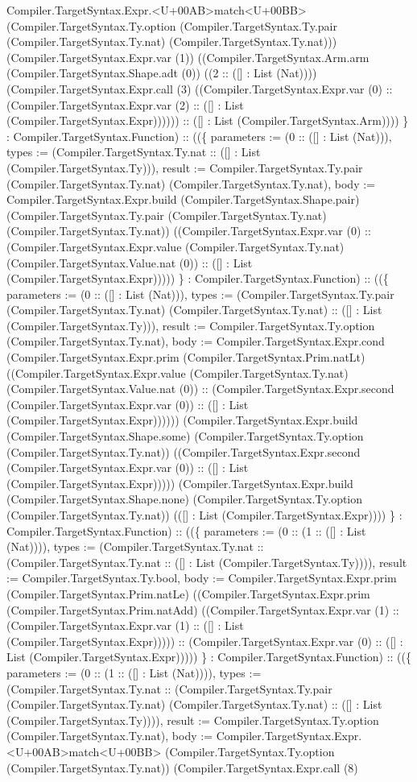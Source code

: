\documentclass[11pt]{article}
\begin{document}
Compiler.TargetSyntax.Expr.<U+00AB>match<U+00BB> (Compiler.TargetSyntax.Ty.option (Compiler.TargetSyntax.Ty.pair (Compiler.TargetSyntax.Ty.nat) (Compiler.TargetSyntax.Ty.nat))) (Compiler.TargetSyntax.Expr.var (1)) ((Compiler.TargetSyntax.Arm.arm (Compiler.TargetSyntax.Shape.adt (0)) ((2 :: ([] : List (Nat)))) (Compiler.TargetSyntax.Expr.call (3) ((Compiler.TargetSyntax.Expr.var (0) :: (Compiler.TargetSyntax.Expr.var (2) :: ([] : List (Compiler.TargetSyntax.Expr)))))) :: ([] : List (Compiler.TargetSyntax.Arm)))) \} : Compiler.TargetSyntax.Function) :: ((\{ parameters := (0 :: ([] : List (Nat))), types := (Compiler.TargetSyntax.Ty.nat :: ([] : List (Compiler.TargetSyntax.Ty))), result := Compiler.TargetSyntax.Ty.pair (Compiler.TargetSyntax.Ty.nat) (Compiler.TargetSyntax.Ty.nat), body := Compiler.TargetSyntax.Expr.build (Compiler.TargetSyntax.Shape.pair) (Compiler.TargetSyntax.Ty.pair (Compiler.TargetSyntax.Ty.nat) (Compiler.TargetSyntax.Ty.nat)) ((Compiler.TargetSyntax.Expr.var (0) :: (Compiler.TargetSyntax.Expr.value (Compiler.TargetSyntax.Ty.nat) (Compiler.TargetSyntax.Value.nat (0)) :: ([] : List (Compiler.TargetSyntax.Expr))))) \} : Compiler.TargetSyntax.Function) :: ((\{ parameters := (0 :: ([] : List (Nat))), types := (Compiler.TargetSyntax.Ty.pair (Compiler.TargetSyntax.Ty.nat) (Compiler.TargetSyntax.Ty.nat) :: ([] : List (Compiler.TargetSyntax.Ty))), result := Compiler.TargetSyntax.Ty.option (Compiler.TargetSyntax.Ty.nat), body := Compiler.TargetSyntax.Expr.cond (Compiler.TargetSyntax.Expr.prim (Compiler.TargetSyntax.Prim.natLt) ((Compiler.TargetSyntax.Expr.value (Compiler.TargetSyntax.Ty.nat) (Compiler.TargetSyntax.Value.nat (0)) :: (Compiler.TargetSyntax.Expr.second (Compiler.TargetSyntax.Expr.var (0)) :: ([] : List (Compiler.TargetSyntax.Expr)))))) (Compiler.TargetSyntax.Expr.build (Compiler.TargetSyntax.Shape.some) (Compiler.TargetSyntax.Ty.option (Compiler.TargetSyntax.Ty.nat)) ((Compiler.TargetSyntax.Expr.second (Compiler.TargetSyntax.Expr.var (0)) :: ([] : List (Compiler.TargetSyntax.Expr))))) (Compiler.TargetSyntax.Expr.build (Compiler.TargetSyntax.Shape.none) (Compiler.TargetSyntax.Ty.option (Compiler.TargetSyntax.Ty.nat)) (([] : List (Compiler.TargetSyntax.Expr)))) \} : Compiler.TargetSyntax.Function) :: ((\{ parameters := (0 :: (1 :: ([] : List (Nat)))), types := (Compiler.TargetSyntax.Ty.nat :: (Compiler.TargetSyntax.Ty.nat :: ([] : List (Compiler.TargetSyntax.Ty)))), result := Compiler.TargetSyntax.Ty.bool, body := Compiler.TargetSyntax.Expr.prim (Compiler.TargetSyntax.Prim.natLe) ((Compiler.TargetSyntax.Expr.prim (Compiler.TargetSyntax.Prim.natAdd) ((Compiler.TargetSyntax.Expr.var (1) :: (Compiler.TargetSyntax.Expr.var (1) :: ([] : List (Compiler.TargetSyntax.Expr))))) :: (Compiler.TargetSyntax.Expr.var (0) :: ([] : List (Compiler.TargetSyntax.Expr))))) \} : Compiler.TargetSyntax.Function) :: ((\{ parameters := (0 :: (1 :: ([] : List (Nat)))), types := (Compiler.TargetSyntax.Ty.nat :: (Compiler.TargetSyntax.Ty.pair (Compiler.TargetSyntax.Ty.nat) (Compiler.TargetSyntax.Ty.nat) :: ([] : List (Compiler.TargetSyntax.Ty)))), result := Compiler.TargetSyntax.Ty.option (Compiler.TargetSyntax.Ty.nat), body := Compiler.TargetSyntax.Expr.<U+00AB>match<U+00BB> (Compiler.TargetSyntax.Ty.option (Compiler.TargetSyntax.Ty.nat)) (Compiler.TargetSyntax.Expr.call (8) 
\end{document}

